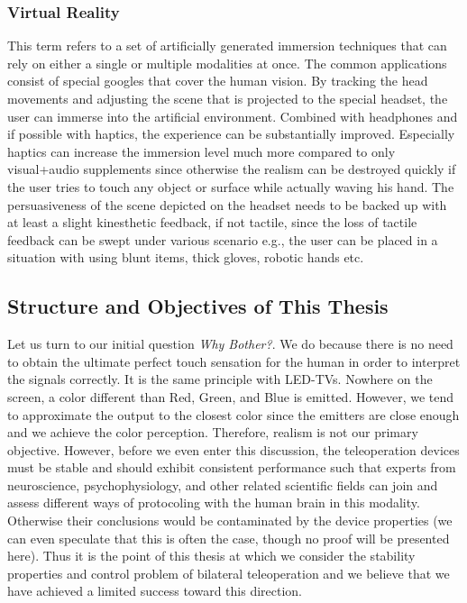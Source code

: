 \subsubsection{Virtual Reality}

This term refers to a set of artificially generated immersion techniques that can rely on either a single or multiple modalities at once. The common applications consist of special googles that cover the human vision. By tracking the head movements and adjusting the scene that is projected to the special headset, the user can immerse into the artificial environment. Combined with headphones and if possible with haptics, the experience can be substantially improved. Especially haptics can increase the immersion level much more compared to only visual+audio supplements since otherwise the realism can be destroyed quickly if the user tries to touch any object or surface while actually waving his hand. The persuasiveness of the scene depicted on the headset needs to be backed up with at least a slight kinesthetic feedback, if not tactile, since the loss of tactile feedback can be swept under various scenario e.g., the user can be placed in a situation with using blunt items, thick gloves, robotic hands etc. 



\subsection{Structure and Objectives of This Thesis}
Let us turn to our initial question \emph{Why Bother?}. We do because there is no need to obtain the ultimate perfect touch sensation for the human in order to interpret the signals correctly. It is the same principle with LED-TVs. Nowhere on the screen, a color different than Red, Green, and Blue is emitted. However, we tend to approximate the output to the closest color since the emitters are close enough and we achieve the color perception. Therefore, realism is not our primary objective. However, before we even enter this discussion, the teleoperation devices must be stable and should exhibit consistent performance such that experts from neuroscience, psychophysiology, and other related scientific fields can join and assess different ways of protocoling with the human brain in this modality. Otherwise their conclusions would be contaminated by the device properties (we can even speculate that this is often the case, though no proof will be presented here). Thus it is the point of this thesis at which we consider the stability properties and control problem of bilateral teleoperation and we believe that we have achieved a limited success toward this direction.


